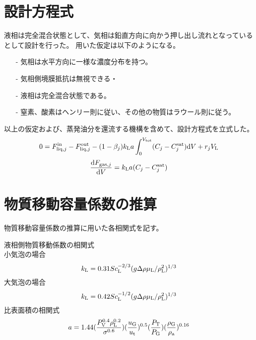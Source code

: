 \documentclass[a4j]{jsreport}
\begin{document}
\section{設計方程式}
液相は完全混合状態として、気相は鉛直方向に向かう押し出し流れとなっているとして設計を行った。
用いた仮定は以下のようになる。
\begin{itemize} 
    \item[-] 気相は水平方向に一様な濃度分布を持つ。
    \item[-] 気相側境膜抵抗は無視できる・
    \item[-] 液相は完全混合状態である。
    \item[-] 窒素、酸素はヘンリー則に従い、その他の物質はラウール則に従う。
\end{itemize}
以上の仮定および、蒸発油分を還流する機構を含めて、設計方程式を立式した。\\
\begin{equation}\nonumber
    0=F^{{\rm in}}_{{\rm liq},j}-F^{{\rm out}}_{{\rm liq},j} -(1-\beta_j) k_{{\rm L}}a
    \int^{V_{{\rm tot}}}_0(C_j - C^{{\rm sat}}_j){\rm d}V + r_j V_{{\rm L}}
\end{equation}
\begin{equation}\nonumber                                                
    \frac{{\rm d}F_{{\rm gas},j}}{{\rm d}V} = k_{{\rm L}}a(C_j - C^{{\rm sat}}_j)
\end{equation}

\section{物質移動容量係数の推算}
物質移動容量係数の推算に用いた各相関式を記す。

液相側物質移動係数の相関式\\
小気泡の場合
\begin{equation}
    k_{{\rm L}} = 0.31Sc_{{\rm L}}^{-2/3}(g \Delta \rho \mu_{{\rm L}}/\rho_{{\rm L}}^2)^{1/3}
\end{equation}
大気泡の場合
\begin{equation}
    k_{{\rm L}} = 0.42Sc_{{\rm L}}^{-1/2}(g \Delta \rho \mu_{{\rm L}}/\rho_{{\rm L}}^2)^{1/3}
\end{equation}
比表面積の相関式
\begin{equation}
    a = 1.44(\frac{P_{{\rm V}}^{0.4} \rho_{{\rm L}}^{0.2} }{ \sigma^{0.6}})(\frac{u_{{\rm G}}}{u_{{\rm t}}})^{0.5}(\frac{P_{{\rm T}}}{P_{{\rm G}}})(\frac{\rho_{{\rm G}}}{\rho_{{\rm a}}})^{0.16}
\end{equation}
\end{document}
